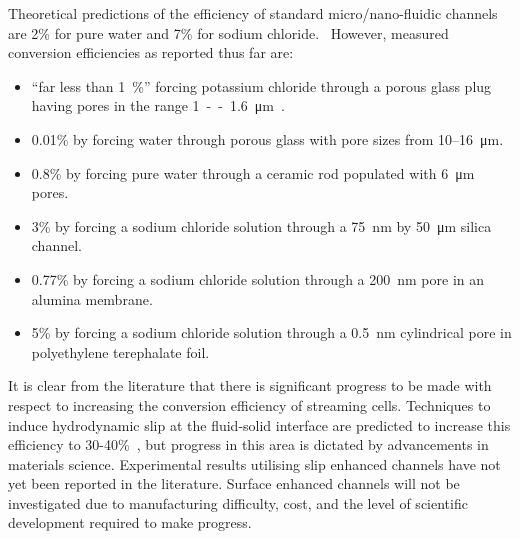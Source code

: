     Theoretical predictions of the efficiency of standard micro/nano-fluidic channels are 2\% for pure water and 7\% for sodium chloride.~\cite{VanderHeyden2006}
    However, measured conversion efficiencies as reported thus far are:
    \begin{itemize}
      \item ``far less than \SI{1}{\percent}'' forcing potassium chloride through a porous glass plug having pores in the range \SI{1}--\SI{1.6}{\micro\meter}~\cite{Olthuis2005}.
      \item 0.01\% by forcing water through porous glass with pore sizes from 10\thinspace--\SI{16}{\micro\metre}.~\cite{Yang2003}
      \item 0.8\% by forcing pure water through a ceramic rod populated with \SI{6}{\micro\metre} pores.~\cite{Yang2004}
      \item 3\% by forcing a sodium chloride solution through a \SI{75}{\nano\metre} by \SI{50}{\micro\metre} silica channel.~\cite{Heyden2007}
      \item 0.77\% by forcing a sodium chloride solution through a \SI{200}{\nano\metre} pore in an alumina membrane.~\cite{Lu2006}
      \item 5\% by forcing a sodium chloride solution through a \SI{0.5}{\nano\metre} cylindrical pore in polyethylene terephalate foil.~\cite{Xie2008}
    \end{itemize}
    It is clear from the literature that there is significant progress to be made with respect to increasing the conversion efficiency of streaming cells.
    Techniques to induce hydrodynamic slip at the fluid-solid interface are predicted to increase this efficiency to 30-40\%~\cite{Davidson2008a, Ren2008}, but progress in this area is dictated by advancements in materials science.
    Experimental results utilising slip enhanced channels have not yet been reported in the literature.
    Surface enhanced channels will not be investigated due to manufacturing difficulty, cost, and the level of scientific development required to make progress.


